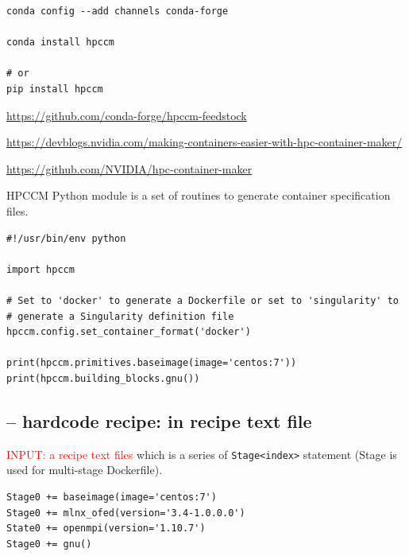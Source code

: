 \begin{verbatim}
conda config --add channels conda-forge

conda install hpccm

# or 
pip install hpccm
\end{verbatim}
\url{https://github.com/conda-forge/hpccm-feedstock}

\url{https://devblogs.nvidia.com/making-containers-easier-with-hpc-container-maker/}

\url{https://github.com/NVIDIA/hpc-container-maker}

HPCCM Python module is a set of routines to generate container specification files.
\begin{verbatim}
#!/usr/bin/env python

import hpccm

# Set to 'docker' to generate a Dockerfile or set to 'singularity' to
# generate a Singularity definition file
hpccm.config.set_container_format('docker')

print(hpccm.primitives.baseimage(image='centos:7'))
print(hpccm.building_blocks.gnu())
\end{verbatim}

\subsection{-- hardcode recipe: in recipe text file}

\textcolor{red}{INPUT: a recipe text files} which is a series of \verb!Stage<index>! statement
(Stage is used for multi-stage Dockerfile).

\begin{verbatim}
Stage0 += baseimage(image='centos:7')
Stage0 += mlnx_ofed(version='3.4-1.0.0.0')
State0 += openmpi(version='1.10.7')
Stage0 += gnu()
\end{verbatim}

